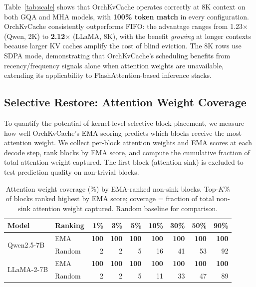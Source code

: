 \documentclass[conference]{IEEEtran}
\begin{document}
Table~\ref{tab:scale} shows that OrchKvCache operates correctly at 8K context on both GQA and MHA models, with \textbf{100\% token match} in every configuration.  OrchKvCache consistently outperforms FIFO: the advantage ranges from 1.23$\times$ (Qwen, 2K) to \textbf{2.12$\times$} (LLaMA, 8K), with the benefit \emph{growing} at longer contexts because larger KV caches amplify the cost of blind eviction.  The 8K rows use SDPA mode, demonstrating that OrchKvCache's scheduling benefits from recency/frequency signals alone when attention weights are unavailable, extending its applicability to FlashAttention-based inference stacks.

\subsection{Selective Restore: Attention Weight Coverage}
\label{sec:selective-restore}

To quantify the potential of kernel-level selective block placement, we measure how well OrchKvCache's EMA scoring predicts which blocks receive the most attention weight. We collect per-block attention weights and EMA scores at each decode step, rank blocks by EMA score, and compute the cumulative fraction of total attention weight captured. The first block (attention sink) is excluded to test prediction quality on non-trivial blocks.

\begin{table}[t]
\centering
\caption{Attention weight coverage (\%) by EMA-ranked non-sink blocks.  Top-$K$\% of blocks ranked highest by EMA score; coverage = fraction of total non-sink attention weight captured.  Random baseline for comparison.}
\label{tab:selective}
\small
\begin{tabular}{@{}llrrrrrrr@{}}
\toprule
Model & Ranking & 1\% & 3\% & 5\% & 10\% & 30\% & 50\% & 90\% \\
\midrule
\multirow{2}{*}{Qwen2.5-7B}
  & EMA    & \textbf{100} & \textbf{100} & \textbf{100} & \textbf{100} & \textbf{100} & \textbf{100} & \textbf{100} \\
  & Random & 2 & 2 & 5 & 16 & 41 & 53 & 92 \\
\midrule
\multirow{2}{*}{LLaMA-2-7B}
  & EMA    & \textbf{100} & \textbf{100} & \textbf{100} & \textbf{100} & \textbf{100} & \textbf{100} & \textbf{100} \\
  & Random & 2 & 2 & 5 & 11 & 33 & 47 & 89 \\
\bottomrule
\end{tabular}
\end{table}
\end{document}

